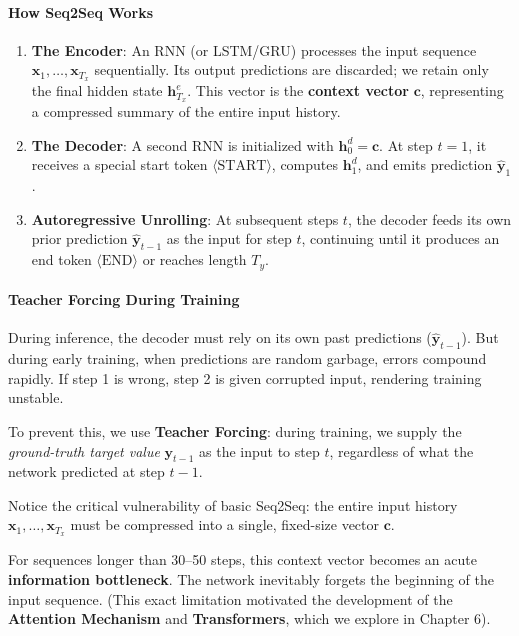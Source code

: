 \paragraph{How Seq2Seq Works}
\begin{enumerate}
    \item \textbf{The Encoder}: An RNN (or LSTM/GRU) processes the input sequence $\mathbf{x}_1, \dots, \mathbf{x}_{T_x}$ sequentially. Its output predictions are discarded; we retain only the final hidden state $\mathbf{h}_{T_x}^e$. This vector is the \textbf{context vector} $\mathbf{c}$, representing a compressed summary of the entire input history.
    \item \textbf{The Decoder}: A second RNN is initialized with $\mathbf{h}_0^d = \mathbf{c}$. At step $t=1$, it receives a special start token $\langle\text{START}\rangle$, computes $\mathbf{h}_1^d$, and emits prediction $\hat{\mathbf{y}}_1$. 
    \item \textbf{Autoregressive Unrolling}: At subsequent steps $t$, the decoder feeds its own prior prediction $\hat{\mathbf{y}}_{t-1}$ as the input for step $t$, continuing until it produces an end token $\langle\text{END}\rangle$ or reaches length $T_y$.
\end{enumerate}

\paragraph{Teacher Forcing During Training}
During inference, the decoder must rely on its own past predictions ($\hat{\mathbf{y}}_{t-1}$). But during early training, when predictions are random garbage, errors compound rapidly. If step 1 is wrong, step 2 is given corrupted input, rendering training unstable.

To prevent this, we use \textbf{Teacher Forcing}: during training, we supply the \emph{ground-truth target value} $\mathbf{y}_{t-1}$ as the input to step $t$, regardless of what the network predicted at step $t-1$.

\begin{warning}
Notice the critical vulnerability of basic Seq2Seq: the entire input history $\mathbf{x}_1, \dots, \mathbf{x}_{T_x}$ must be compressed into a single, fixed-size vector $\mathbf{c}$. 

For sequences longer than 30--50 steps, this context vector becomes an acute \textbf{information bottleneck}. The network inevitably forgets the beginning of the input sequence. (This exact limitation motivated the development of the \textbf{Attention Mechanism} and \textbf{Transformers}, which we explore in Chapter 6).
\end{warning}

